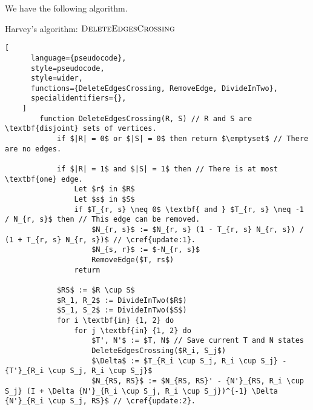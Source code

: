 We have the following algorithm.

\begin{programruledcaption}{Harvey's algorithm: \(\textsc{DeleteEdgesCrossing}\)}
    \begin{lstlisting}[
      language={pseudocode},
      style=pseudocode,
      style=wider,
      functions={DeleteEdgesCrossing, RemoveEdge, DivideInTwo},
      specialidentifiers={},
    ]
        function DeleteEdgesCrossing(R, S) // R and S are \textbf{disjoint} sets of vertices.
            if $|R| = 0$ or $|S| = 0$ then return $\emptyset$ // There are no edges.

            if $|R| = 1$ and $|S| = 1$ then // There is at most \textbf{one} edge.
                Let $r$ in $R$
                Let $s$ in $S$
                if $T_{r, s} \neq 0$ \textbf{ and } $T_{r, s} \neq -1 / N_{r, s}$ then // This edge can be removed.
                    $N_{r, s}$ := $N_{r, s} (1 - T_{r, s} N_{r, s}) / (1 + T_{r, s} N_{r, s})$ // \cref{update:1}.
                    $N_{s, r}$ := $-N_{r, s}$
                    RemoveEdge($T, rs$)
                return

            $RS$ := $R \cup S$
            $R_1, R_2$ := DivideInTwo($R$)
            $S_1, S_2$ := DivideInTwo($S$)
            for i \textbf{in} {1, 2} do
                for j \textbf{in} {1, 2} do
                    $T', N'$ := $T, N$ // Save current T and N states
                    DeleteEdgesCrossing($R_i, S_j$)
                    $\Delta$ := $T_{R_i \cup S_j, R_i \cup S_j} - {T'}_{R_i \cup S_j, R_i \cup S_j}$
                    $N_{RS, RS}$ := $N_{RS, RS}' - {N'}_{RS, R_i \cup S_j} (I + \Delta {N'}_{R_i \cup S_j, R_i \cup S_j})^{-1} \Delta {N'}_{R_i \cup S_j, RS}$ // \cref{update:2}.
    \end{lstlisting}
\end{programruledcaption}

